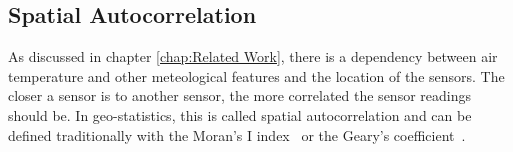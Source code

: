 \subsection{Spatial Autocorrelation}

As discussed in chapter \ref{chap:Related Work}, there is a dependency between air temperature and other meteological features and the location of the sensors. The closer a sensor is to another sensor, the more correlated the sensor readings should be.
In geo-statistics, this is called spatial autocorrelation and can be defined traditionally with the Moran's I index~\cite{moran1948interpretation} or the Geary's coefficient~\cite{geary1954contiguity}. 

